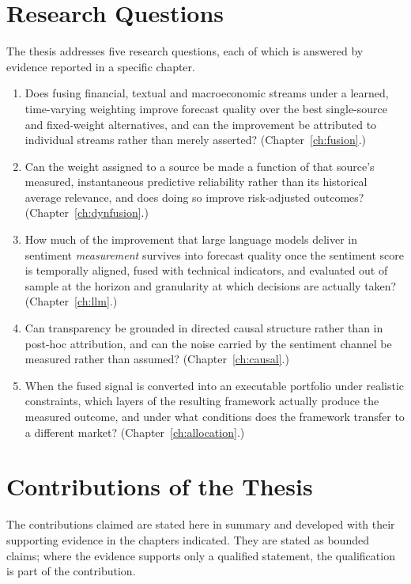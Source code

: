 \section{Research Questions}

The thesis addresses five research questions, each of which is answered by evidence reported
in a specific chapter.

\begin{enumerate}[label=\textbf{RQ\arabic*.},leftmargin=2.8em]
\item Does fusing financial, textual and macroeconomic streams under a learned, time-varying
weighting improve forecast quality over the best single-source and fixed-weight alternatives,
and can the improvement be attributed to individual streams rather than merely asserted?
(Chapter~\ref{ch:fusion}.)

\item Can the weight assigned to a source be made a function of that source's measured,
instantaneous predictive reliability rather than its historical average relevance, and does
doing so improve risk-adjusted outcomes? (Chapter~\ref{ch:dynfusion}.)

\item How much of the improvement that large language models deliver in sentiment
\emph{measurement} survives into forecast quality once the sentiment score is temporally
aligned, fused with technical indicators, and evaluated out of sample at the horizon and
granularity at which decisions are actually taken? (Chapter~\ref{ch:llm}.)

\item Can transparency be grounded in directed causal structure rather than in post-hoc
attribution, and can the noise carried by the sentiment channel be measured rather than
assumed? (Chapter~\ref{ch:causal}.)

\item When the fused signal is converted into an executable portfolio under realistic
constraints, which layers of the resulting framework actually produce the measured outcome,
and under what conditions does the framework transfer to a different market?
(Chapter~\ref{ch:allocation}.)
\end{enumerate}

\section{Contributions of the Thesis}

The contributions claimed are stated here in summary and developed with their supporting
evidence in the chapters indicated. They are stated as bounded claims; where the evidence
supports only a qualified statement, the qualification is part of the contribution.

